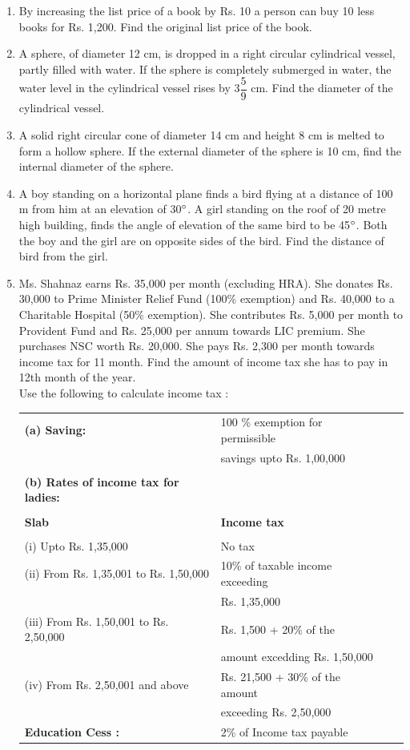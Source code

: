 \documentclass[journal,12pt,twocolumn]{IEEEtran}
\renewcommand\thesection{\arabic{section}}
\begin{document}
\begin{enumerate}[label=\thesection.\arabic*.,ref=\thesection.\theenumi]
\item  By increasing the list price of a book by Rs. 10 a person can buy 10 less books for Rs. 1,200. Find the original list price of the book.
\item A sphere, of diameter 12 cm, is dropped in a right circular cylindrical vessel, partly filled with water. If the sphere is completely submerged in water, the water level in the cylindrical vessel rises by {3}$\dfrac{5}{9}$ cm. Find the diameter of the cylindrical vessel.
\item A solid right circular cone of diameter 14 cm and height 8 cm is melted to form a hollow sphere. If the external diameter of the sphere is 10 cm, find the internal diameter of the sphere.
\item A boy standing on a horizontal plane finds a bird flying at a distance of 100 m from him at an elevation of 30$\degree$. A girl standing on the roof of 20 metre high building, finds the angle of elevation of the same bird to be 45$\degree$. Both the boy and the girl are on opposite sides of the bird. Find the distance of bird from the girl.
\item Ms. Shahnaz earns Rs. 35,000 per month (excluding HRA). She donates Rs. 30,000 to Prime Minister Relief Fund (100\% exemption) and Rs. 40,000 to a Charitable Hospital (50\% exemption). She contributes Rs. 5,000 per month to Provident Fund and Rs. 25,000 per annum towards LIC premium. She purchases NSC worth Rs. 20,000. She pays Rs. 2,300 per month towards income tax for 11 month. Find the amount of income tax she has to pay in 12th month of the year.\\
Use the following to calculate income tax :
\begin{table}[ht]
    \begin{tabular}{l l c c}
    \textbf{(a) Saving:} & 100 \% exemption for permissible \\ & savings  upto Rs. 1,00,000 \\ \\
    \textbf{(b) Rates of income tax for ladies:} &\\ \\
    \textbf{Slab} & \textbf{Income tax} \\ \\
    (i) Upto Rs. 1,35,000 & No tax \\ 
    (ii) From Rs. 1,35,001 to Rs. 1,50,000 & 10\% of taxable income exceeding \\& Rs. 1,35,000 \\ 
    (iii) From Rs. 1,50,001 to Rs. 2,50,000 & Rs. 1,500 + 20\% of the \\& amount excedding Rs. 1,50,000 \\
    (iv) From Rs. 2,50,001 and above & Rs. 21,500 + 30\% of the amount \\& exceeding Rs. 2,50,000 \\
    \textbf{Education Cess :} & 2\% of Income tax payable
    \end{tabular}
\end{table}
\end{enumerate}
\end{document}
